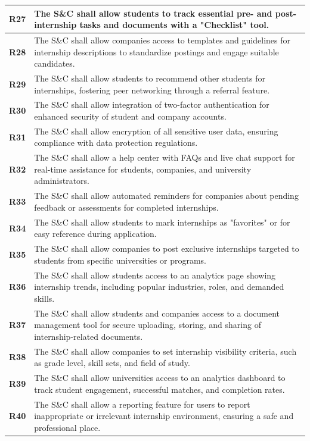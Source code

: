\begin{longtable}{|p{}|p{}|}
\hline
\textbf{R27} & The S\&C shall allow students to track essential pre- and post-internship tasks and documents with a "Checklist" tool. \\ 
\hline
\textbf{R28} & The S\&C shall allow companies access to templates and guidelines for internship descriptions to standardize postings and engage suitable candidates. \\ 
\hline
\textbf{R29} & The S\&C shall allow students to recommend other students for internships, fostering peer networking through a referral feature. \\ 
\hline
\textbf{R30} & The S\&C shall allow integration of two-factor authentication for enhanced security of student and company accounts. \\ 
\hline
\textbf{R31} & The S\&C shall allow encryption of all sensitive user data, ensuring compliance with data protection regulations. \\ 
\hline
\textbf{R32} & The S\&C shall allow a help center with FAQs and live chat support for real-time assistance for students, companies, and university administrators. \\ 
\hline
\textbf{R33} & The S\&C shall allow automated reminders for companies about pending feedback or assessments for completed internships. \\ 
\hline
\textbf{R34} & The S\&C shall allow students to mark internships as "favorites" or for easy reference during application. \\ 
\hline
\textbf{R35} & The S\&C shall allow companies to post exclusive internships targeted to students from specific universities or programs. \\ 
\hline
\textbf{R36} & The S\&C shall allow students access to an analytics page showing internship trends, including popular industries, roles, and demanded skills. \\ 
\hline
\textbf{R37} & The S\&C shall allow students and companies access to a document management tool for secure uploading, storing, and sharing of internship-related documents. \\ 
\hline
\textbf{R38} & The S\&C shall allow companies to set internship visibility criteria, such as grade level, skill sets, and field of study. \\ 
\hline
\textbf{R39} & The S\&C shall allow universities access to an analytics dashboard to track student engagement, successful matches, and completion rates. \\ 
\hline
\textbf{R40} & The S\&C shall allow a reporting feature for users to report inappropriate or irrelevant internship environment, ensuring a safe and professional place. \\ 

\end{longtable}
